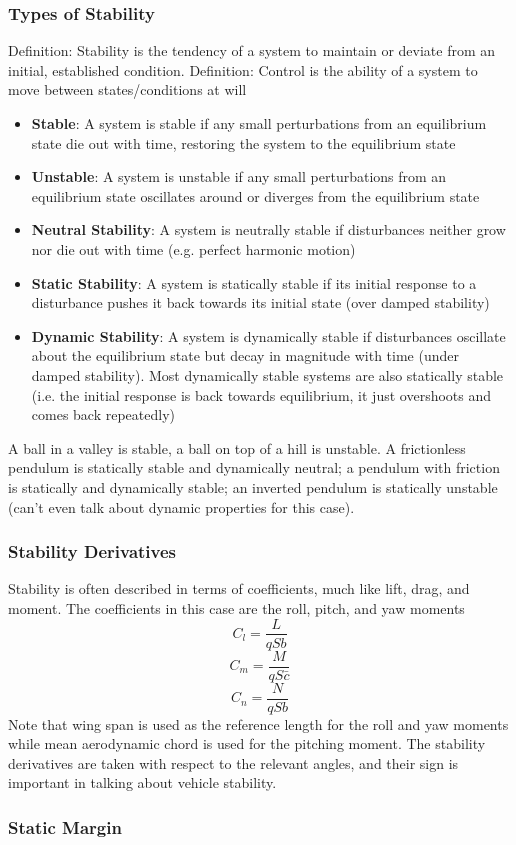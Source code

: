 \documentclass[12pt]{article}
\newcommand{\Item}[1]{\item \textbf{#1}:}
\begin{document}
\subsubsection{Types of Stability}
Definition: Stability is the tendency of a system to maintain or deviate from an initial, established condition.
Definition: Control is the ability of a system to move between states/conditions at will
\begin{itemize}
\Item{Stable} A system is stable if any small perturbations from an equilibrium state die out with time, restoring the system to the equilibrium state
\Item{Unstable} A system is unstable if any small perturbations from an equilibrium state oscillates around or diverges from the equilibrium state
\Item{Neutral Stability} A system is neutrally stable if disturbances neither grow nor die out with time (e.g. perfect harmonic motion)
\Item{Static Stability} A system is statically stable if its initial response to a disturbance pushes it back towards its initial state (over damped stability)
\Item{Dynamic Stability} A system is dynamically stable if disturbances oscillate about the equilibrium state but decay in magnitude with time (under damped stability). Most dynamically stable systems are also statically stable (i.e. the initial response is back towards equilibrium, it just overshoots and comes back repeatedly)
\end{itemize}

A ball in a valley is stable, a ball on top of a hill is unstable. A frictionless pendulum is statically stable and dynamically neutral; a pendulum with friction is statically and dynamically stable; an inverted pendulum is statically unstable (can't even talk about dynamic properties for this case).
\subsubsection{Stability Derivatives}
Stability is often described in terms of coefficients, much like lift, drag, and moment. The coefficients in this case are the roll, pitch, and yaw moments
$$C_l = \frac{L}{qSb}$$
$$C_m = \frac{M}{qS\bar{c}}$$
$$C_n = \frac{N}{qSb}$$
Note that wing span is used as the reference length for the roll and yaw moments while mean aerodynamic chord is used for the pitching moment. The stability derivatives are taken with respect to the relevant angles, and their sign is important in talking about vehicle stability.

\subsubsection{Static Margin}
\end{document}
